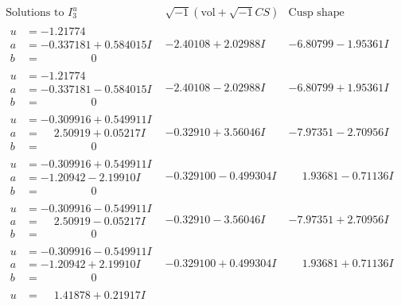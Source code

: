 \documentclass[1p]{elsarticle_modified}
\theoremstyle{definition}
\newcommand{\I}{\sqrt{-1}}
\begin{document}
$$\begin{array}{c|c|c}  
\text{Solutions to }I^u_{3}& \I (\text{vol} + \sqrt{-1}CS) & \text{Cusp shape}\\
 \hline 
\begin{aligned}
u &= -1.21774\phantom{ +0.000000I} \\
a &= -0.337181 + 0.584015 I \\
b &= \phantom{-0.000000 } 0\end{aligned}
 & -2.40108 + 2.02988 I & -6.80799 - 1.95361 I \\ \hline\begin{aligned}
u &= -1.21774\phantom{ +0.000000I} \\
a &= -0.337181 - 0.584015 I \\
b &= \phantom{-0.000000 } 0\end{aligned}
 & -2.40108 - 2.02988 I & -6.80799 + 1.95361 I \\ \hline\begin{aligned}
u &= -0.309916 + 0.549911 I \\
a &= \phantom{-}2.50919 + 0.05217 I \\
b &= \phantom{-0.000000 } 0\end{aligned}
 & -0.32910 + 3.56046 I & -7.97351 - 2.70956 I \\ \hline\begin{aligned}
u &= -0.309916 + 0.549911 I \\
a &= -1.20942 - 2.19910 I \\
b &= \phantom{-0.000000 } 0\end{aligned}
 & -0.329100 - 0.499304 I & \phantom{-}1.93681 - 0.71136 I \\ \hline\begin{aligned}
u &= -0.309916 - 0.549911 I \\
a &= \phantom{-}2.50919 - 0.05217 I \\
b &= \phantom{-0.000000 } 0\end{aligned}
 & -0.32910 - 3.56046 I & -7.97351 + 2.70956 I \\ \hline\begin{aligned}
u &= -0.309916 - 0.549911 I \\
a &= -1.20942 + 2.19910 I \\
b &= \phantom{-0.000000 } 0\end{aligned}
 & -0.329100 + 0.499304 I & \phantom{-}1.93681 + 0.71136 I \\ \hline\begin{aligned}
u &= \phantom{-}1.41878 + 0.21917 I \\

\end{aligned}
\end{array}$$
\end{document}
